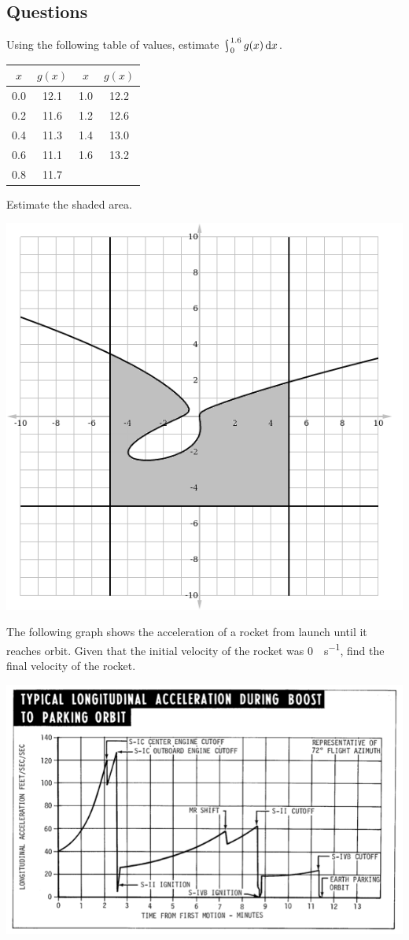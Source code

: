 \clearpage
\subsection*{Questions}
\begin{questions}
  \question Using the following table of values, estimate $ \rint^{1.6}_0 g(x) \dif{x} $.
            \begin{center}
              \begin{tabular}{|c|c||c|c|}\hline
                $ x $ & $ g(x) $ & $ x $ & $ g(x) $\\\hline
                0.0 & 12.1 & 1.0 & 12.2\\
                0.2 & 11.6 & 1.2 & 12.6\\
                0.4 & 11.3 & 1.4 & 13.0\\
                0.6 & 11.1 & 1.6 & 13.2\\
                0.8 & 11.7 &&\\\hline
              \end{tabular}
            \end{center}
  \question Estimate the shaded area.
            \begin{center}
              \includegraphics[width=0.5\linewidth]{aahw}
            \end{center}
  \question The following graph shows the acceleration of a rocket from launch until it reaches orbit. Given that the
            initial velocity of the rocket was \SI{0}{\foot\per\second}, find the final velocity of the rocket.
            \begin{center}
              \includegraphics[width=0.7\linewidth]{acceleration-time}
            \end{center}
\end{questions}


